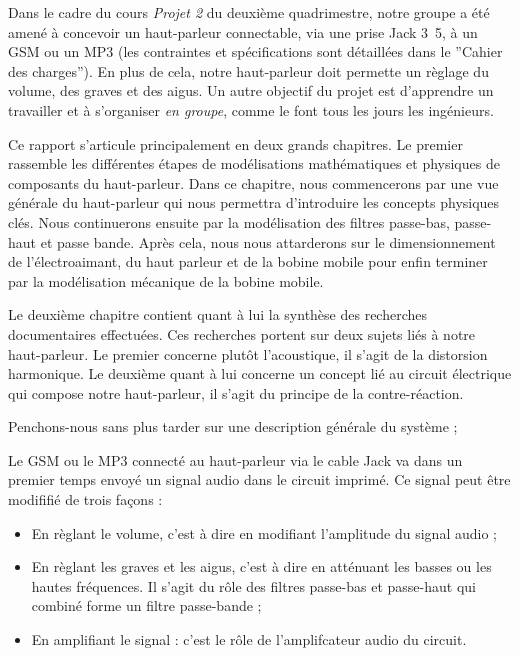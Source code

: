 

Dans le cadre du cours \textit{Projet 2} du deuxième quadrimestre, notre groupe a été amené à 
concevoir un haut-parleur connectable, via une prise Jack \unit{3.5}{\milli\meter}, à un 
GSM ou un MP3 (les contraintes et spécifications sont détaillées dans le ''Cahier des charges''). 
En plus de cela, notre haut-parleur doit permette un règlage du volume, des graves
et des aigus. Un autre objectif du projet est d'apprendre un travailler et à s'organiser \textit{en groupe}, 
comme le font tous les jours les ingénieurs.

Ce rapport s'articule principalement en deux grands chapitres. Le premier
rassemble les différentes étapes de modélisations mathématiques
et physiques de composants du haut-parleur. Dans ce chapitre, nous 
commencerons par une vue générale du haut-parleur qui nous
permettra d'introduire les concepts physiques clés. Nous continuerons
ensuite par la modélisation des filtres passe-bas, passe-haut et passe bande.
Après cela, nous nous attarderons  sur le dimensionnement de l'électroaimant, du haut parleur et
de la bobine mobile pour enfin terminer par la modélisation mécanique de la bobine
mobile.

Le deuxième chapitre contient quant à lui la synthèse des recherches documentaires
effectuées. Ces recherches portent sur deux sujets liés à notre haut-parleur. Le premier
concerne plutôt l'acoustique, il s'agit de la 
distorsion harmonique. Le deuxième quant à lui concerne un concept lié au circuit électrique qui
compose notre haut-parleur, il s'agit du principe de la contre-réaction.


Penchons-nous sans plus tarder sur une description générale du système ; 

Le GSM ou le MP3 connecté au haut-parleur via le cable Jack va dans un premier temps envoyé un signal audio dans le 
circuit imprimé. Ce signal peut être modififié de trois façons :

\begin{itemize}
	\item En règlant le volume, c'est à dire en modifiant l'amplitude du signal audio ;
	\item En règlant les graves et les aigus, c'est à dire en atténuant les basses ou les hautes
	fréquences. Il s'agit du rôle des filtres passe-bas et passe-haut qui combiné forme un filtre 
	passe-bande ;
	\item En amplifiant le signal : c'est le rôle de l'amplifcateur audio du circuit.
\end{itemize}

